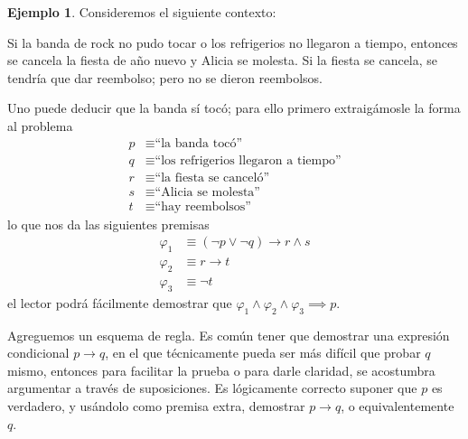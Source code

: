 \documentclass{book}
\theoremstyle{definition}
\newtheorem{ejm}{Ejemplo}[chapter]
\begin{document}
\begin{ejm}
	Consideremos el siguiente contexto:
	
	Si la banda de rock no pudo tocar o los refrigerios no llegaron a tiempo, entonces se cancela la fiesta de año nuevo y Alicia se molesta.
	Si la fiesta se cancela, se tendría que dar reembolso; pero no se dieron reembolsos.
	
	Uno puede deducir que la banda sí tocó; para ello primero extraigámosle la forma al problema
	\begin{align*}
		p &\equiv \text{``la banda tocó''}\\
		q &\equiv \text{``los refrigerios llegaron a tiempo''}\\
		r &\equiv \text{``la fiesta se canceló''}\\
		s &\equiv \text{``Alicia se molesta''}\\
		t &\equiv \text{``hay reembolsos''}
	\end{align*}
	lo que nos da las siguientes premisas
	\begin{align*}
		\varphi_1 &\equiv (\neg p \vee \neg q)\rightarrow r \wedge s\\
		\varphi_2 &\equiv r \rightarrow t \\
		\varphi_3 &\equiv \neg t
	\end{align*}
	el lector podrá fácilmente demostrar que $\varphi_1 \wedge \varphi_2 \wedge \varphi_3 \implies p$.
\end{ejm}

Agreguemos un esquema de regla. Es común tener que demostrar una expresión condicional $p \rightarrow q$, en el que técnicamente pueda ser más difícil que probar $q$ mismo, entonces para facilitar la prueba o para darle claridad, se acostumbra argumentar a través de suposiciones. Es lógicamente correcto suponer que $p$ es verdadero, y usándolo como premisa extra, demostrar $p \rightarrow q$, o equivalentemente $q$.

\end{document}
